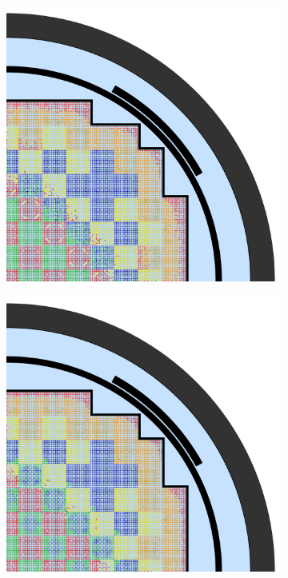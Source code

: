 \begin{appendices}
\begin{figure}[h!]
\centering
\begin{subfigure}{0.48\textwidth}
  \centering
  \includegraphics[width=0.85\linewidth]{figures/unsupervised/geometries/without-features/2-clusters/pinch/full-core}
  \caption{}
  \label{fig:no-features-full-core-pinch-2}
\end{subfigure}%
\begin{subfigure}{0.48\textwidth}
  \centering
  \includegraphics[width=0.85\linewidth]{figures/unsupervised/geometries/without-features/2-clusters/combined/full-core}

\end{subfigure}
\end{figure}
\end{appendices}
